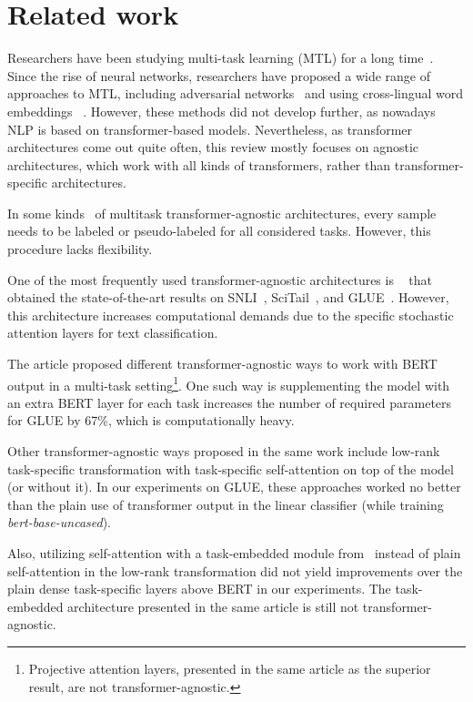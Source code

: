 \section{Related work}

Researchers have been studying multi-task learning (MTL) for a long time~\cite{caruana1997multi-task}. Since the rise of neural networks, researchers have proposed a wide range of approaches to MTL, including adversarial networks~\cite{wang-etal-2018-personalized} and using cross-lingual word embeddings~\cite{buryat} . However, these methods did not develop further, as nowadays NLP is based on transformer-based models. Nevertheless, as transformer architectures come out quite often, this review mostly focuses on agnostic architectures, which work with all kinds of transformers, rather than transformer-specific architectures.

In some kinds~\cite{pseudolabeling} of multitask transformer-agnostic architectures, every sample needs to be labeled or pseudo-labeled for all considered tasks. However, this procedure lacks flexibility.

One of the most frequently used transformer-agnostic architectures is ~\cite{MTDNN:19} that obtained the state-of-the-art results on SNLI~\cite{snli}, SciTail~\cite{khot2018scitail}, and GLUE~\cite{GLUE:19}. However, this architecture increases computational demands due to the specific stochastic attention layers for text classification.

The article \cite{PAL:19} proposed different transformer-agnostic ways to work with BERT output in a multi-task setting\footnote{Projective attention layers, presented in the same article as the superior result, are not transformer-agnostic.}. One such way is supplementing the model with an extra BERT layer for each task increases the number of required parameters for GLUE by 67\%, which is computationally heavy. 

Other transformer-agnostic ways proposed in the same work include low-rank task-specific transformation with task-specific self-attention on top of the model (or without it). In our experiments on GLUE, these approaches worked no better than the plain use of transformer output in the linear classifier (while training \textit{bert-base-uncased}).

 Also, utilizing self-attention with a task-embedded module from~\cite{TaskEmbedded2021} instead of plain self-attention in the low-rank transformation did not yield improvements over the plain dense task-specific layers above BERT in our experiments. The task-embedded architecture presented in the same article is still not transformer-agnostic.

